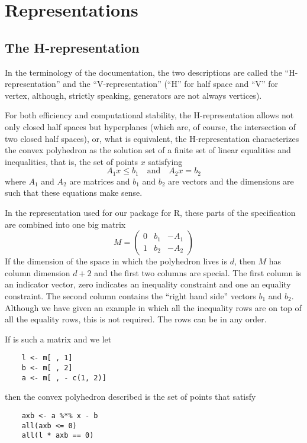 \documentclass{article}
\begin{document}
\section{Representations}

\subsection{The H-representation}

In the terminology of the \verb@cddlib@ documentation,
the two descriptions are called
the ``H-representation'' and the ``V-representation''
(``H'' for half space and ``V'' for vertex,
although, strictly speaking, generators are not always vertices).

For both efficiency and computational stability, the H-representation
allows not only closed half spaces but hyperplanes (which are, of course, the
intersection of two closed half spaces), or, what is equivalent,
the H-representation characterizes the convex polyhedron as the solution
set of a finite set of linear equalities and inequalities, that is,
the set of points $x$ satisfying
$$
   A_1 x \le b_1 \quad \text{and} \quad A_2 x = b_2
$$
where $A_1$ and $A_2$ are matrices and $b_1$ and $b_2$ are vectors
and the dimensions are such that these equations make sense.

In the representation used for our \verb@rcdd@ package
for R, these parts of the specification are combined into one big matrix
$$
   M = \begin{pmatrix} 0 & b_1 & - A_1 \\ 1 & b_2 & - A_2 \end{pmatrix}
$$
If the dimension of the space in which the polyhedron lives is $d$,
then $M$ has column dimension $d + 2$ and the first two columns are special.
The first column is an indicator vector, zero indicates an inequality
constraint and one an equality constraint.  The second column contains
the ``right hand side'' vectors $b_1$ and $b_2$.  Although we have given
an example in which all the inequality rows are on top of all the equality
rows, this is not required.  The rows can be in any order.

If \verb@m@ is such a matrix and we let
\begin{verbatim}
    l <- m[ , 1]
    b <- m[ , 2]
    a <- m[ , - c(1, 2)]
\end{verbatim}
then the convex polyhedron described is the set of points \verb@x@ that
satisfy
\begin{verbatim}
    axb <- a %*% x - b
    all(axb <= 0)
    all(l * axb == 0)
\end{verbatim}
\end{document}
